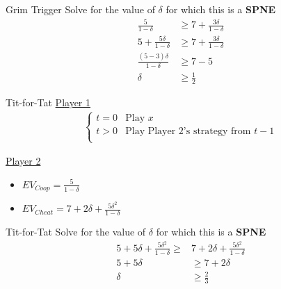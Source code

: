 \begin{frame}{Grim Trigger}
  Solve for the value of $\delta$ for which this is a \textbf{SPNE}
  \pause
  \begin{align*}
    \frac{5}{1-\delta} & \geq 7 + \frac{3\delta}{1-\delta} \\
    5 + \frac{5\delta}{1-\delta} & \geq 7 + \frac{3\delta}{1-\delta} \\
    \frac{(5-3)\delta}{1-\delta} & \geq 7-5 \\
    \delta & \geq \frac{1}{2}
  \end{align*}
\end{frame}

\begin{frame}{Tit-for-Tat}
  \underline{Player 1} 
  \begin{align*}
    \begin{cases}
      t = 0 & \text{Play } x  \\ 
      t > 0 & \text{Play Player 2's strategy from } t-1 \\
    \end{cases} 
  \end{align*}

  \underline{Player 2}
  \begin{itemize}
    \item $EV_{Coop} = \frac{5}{1-\delta}$ 
    \item $EV_{Cheat} = 7 + 2\delta + \frac{5\delta^2}{1-\delta}$
  \end{itemize}
\end{frame}

\begin{frame}{Tit-for-Tat}
  Solve for the value of $\delta$ for which this is a \textbf{SPNE}
  \pause
  \begin{align*}
    5 + 5\delta + \frac{5\delta^2}{1-\delta} \geq & 7 + 2\delta + \frac{5\delta^2}{1-\delta} \\
    5 + 5\delta & \geq 7 + 2\delta \\
    \delta & \geq \frac{2}{3}
  \end{align*}
\end{frame}

